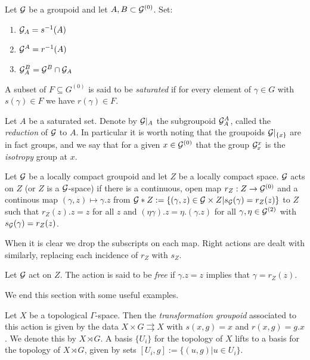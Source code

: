 \begin{definition}
Let $\mathcal{G}$ be a groupoid and let $A,B \subset \mathcal{G}^{(0)}$. Set:
\begin{enumerate}
\item $\mathcal{G}_{A}=s^{-1}(A)$
\item $\mathcal{G}^{A}=r^{-1}(A)$
\item $\mathcal{G}^{B}_{A}=\mathcal{G}^{B} \cap \mathcal{G}_{A}$
\end{enumerate}

\begin{definition}
A subset of $F\subseteq G^{(0)}$ is said to be \textit{saturated} if for every element of $\gamma \in G$ with $s(\gamma) \in F$ we have $r(\gamma) \in F$.
\end{definition}

Let $A$ be a saturated set. Denote by $\mathcal{G}|_{A}$ the subgroupoid $\mathcal{G}_{A}^{A}$, called the \textit{reduction} of $\mathcal{G}$ to $A$. In particular it is worth noting that the groupoids $\mathcal{G}|_{\lbrace x \rbrace}$ are in fact groups, and we say that for a given $x \in \mathcal{G}^{(0)}$ that the group $\mathcal{G}^{x}_{x}$ is the \textit{isotropy} group at $x$.
\end{definition}

\begin{definition}
Let $\mathcal{G}$ be a locally compact groupoid and let $Z$ be a locally compact space. $\mathcal{G}$ acts on $Z$ (or $Z$ is a $\mathcal{G}$-space) if there is a continuous, open map $r_{Z}: Z \rightarrow \mathcal{G}^{(0)}$ and a continous map $(\gamma, z) \mapsto \gamma .z$ from $\mathcal{G} \ast Z:= \lbrace (\gamma, z) \in \mathcal{G} \times Z | s_{\mathcal{G}}(\gamma)=r_{Z}(z)\rbrace$ to $Z$ such that $r_{Z}(z).z=z$ for all $z$ and $(\eta \gamma).z= \eta.(\gamma. z)$ for all $\gamma, \eta \in \mathcal{G}^{(2)}$ with $s_{\mathcal{G}}(\gamma)=r_{Z}(z)$.
\end{definition}

When it is clear we drop the subscripts on each map. Right actions are dealt with similarly, replacing each incidence of $r_{Z}$ with $s_{Z}$.

\begin{definition}
Let $\mathcal{G}$ act on $Z$. The action is said to be \textit{free} if $\gamma.z=z$ implies that $\gamma = r_{Z}(z)$.
\end{definition}
We end this section with some useful examples.

\begin{example}\label{Ex:TransGrp}
Let $X$ be a topological $\Gamma$-space. Then the \textit{transformation groupoid} associated to this action is given by the data $X \times G \rightrightarrows X$ with $s(x,g)=x$ and $r(x,g)=g.x$. We denote this by $X \rtimes G$. A basis $\lbrace U_{i} \rbrace$ for the topology of $X$ lifts to a basis for the topology of $X \rtimes G$, given by sets $[U_{i},g]:=\lbrace (u,g) | u \in U_{i} \rbrace$. 
\end{example}


